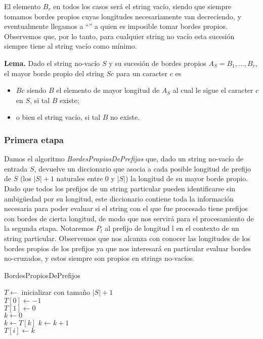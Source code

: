 El elemento $B_r$ en todos los casos será el string vacío, siendo que siempre tomamos bordes propios cuyas longitudes necesariamente van decreciendo, y eventualmente llegamos a ``'' a quien es imposible tomar bordes propios. Observemos que, por lo tanto, para cualquier string no vacío esta sucesión siempre tiene al string vacío como mínimo.

\medskip

\textbf{Lema.} Dado el string no-vacío $S$ y su sucesión de bordes propios $A_S = B_1, \dots, B_r$, el mayor borde propio del string $Sc$ para un caracter $c$ es

\begin{itemize}
\item $Bc$ siendo $B$ el elemento de mayor longitud de $A_S$ al cual le sigue el caracter $c$ en $S$, si tal $B$ existe;
\item o bien el string vacío, si tal $B$ no existe.
\end{itemize}

\subsubsection{Primera etapa}

Damos el algoritmo \textit{BordesPropiosDePrefijos} que, dado un string no-vacío de entrada $S$, devuelve un diccionario que asocia a cada posible longitud de prefijo de $S$ (los $|S|+1$ naturales entre 0 y $|S|$) la longitud de su mayor borde propio. Dado que todos los prefijos de un string particular pueden identificarse sin ambigüedad por su longitud, este diccionario contiene toda la información necesaria para poder evaluar si el string con el que fue procesado tiene prefijos con bordes de cierta longitud, de modo que nos servirá para el procesamiento de la segunda etapa. Notaremos $P_l$ al prefijo de longitud l en el contexto de un string particular. Observemos que nos alcanza con conocer las longitudes de los bordes propios de los prefijos ya que nos interesará en particular evaluar bordes no-cruzados, y estos siempre son propios en strings no-vacíos.

\bigskip

\begin{algorithm}[H]
	\caption{BordesPropiosDePrefijos}

	$T \gets$ inicializar con tamaño $|S|+1$ \\
	$T [0] \gets -1$ \\
	$T [1] \gets 0$ \\
	$k \gets 0$ \\
	
     {
	 {
		$k \gets T[k]$
    	}
	$k \gets k+1$ \\
	$T[i] \gets k$
}

\end{algorithm}

